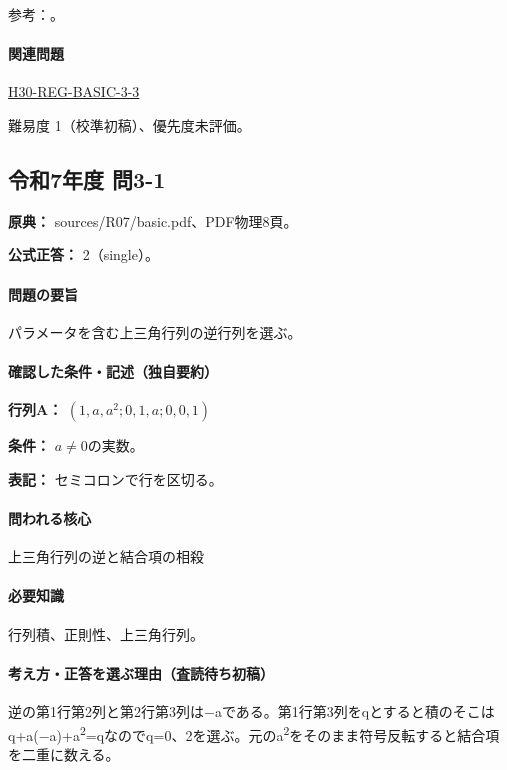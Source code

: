 \par 参考：\cite{mit_inverse2007}。

\paragraph{関連問題} \hyperref[q:h30-reg-basic-3-3]{H30-REG-BASIC-3-3}

\par 難易度 1（校準初稿）、優先度未評価。

\subsection{令和7年度 問3-1}
\label{q:r07-reg-basic-3-1}

\noindent\textbf{原典：} sources/R07/basic.pdf、PDF物理8頁。

\textbf{公式正答：} 2（single）。

\paragraph{問題の要旨} パラメータを含む上三角行列の逆行列を選ぶ。

\paragraph{確認した条件・記述（独自要約）}\mbox{}\par

\noindent\textbf{行列A：} \((1,a,a^2;0,1,a;0,0,1)\)\par

\noindent\textbf{条件：} \(a\neq0\)の実数。\par

\noindent\textbf{表記：} セミコロンで行を区切る。\par

\paragraph{問われる核心} 上三角行列の逆と結合項の相殺

\paragraph{必要知識} 行列積、正則性、上三角行列。

\paragraph{考え方・正答を選ぶ理由（査読待ち初稿）} 逆の第1行第2列と第2行第3列は−aである。第1行第3列をqとすると積のそこはq+a(−a)+a\textsuperscript{2}=qなのでq=\allowbreak{}0、2を選ぶ。元のa\textsuperscript{2}をそのまま符号反転すると結合項を二重に数える。

